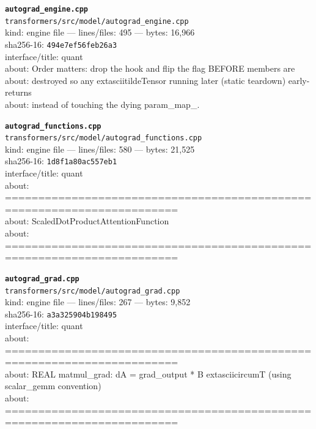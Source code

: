 \noindent\textbf{\texttt{autograd\_engine.cpp}}\\
\texttt{transformers/src/model/autograd\_engine.cpp}\\
kind: engine file --- lines/files: 495 --- bytes: 16,966\\
sha256-16: \texttt{494e7ef56feb26a3}\\
interface/title: quant\\
about: Order matters: drop the hook and flip the flag BEFORE members are\\
about: destroyed so any 	extasciitilde{}Tensor running later (static teardown) early-returns\\
about: instead of touching the dying param\_map\_.\\
\vspace*{6.0pt}

\noindent\textbf{\texttt{autograd\_functions.cpp}}\\
\texttt{transformers/src/model/autograd\_functions.cpp}\\
kind: engine file --- lines/files: 580 --- bytes: 21,525\\
sha256-16: \texttt{1d8f1a80ac557eb1}\\
interface/title: quant\\
about: ========================================================================\\
about: ScaledDotProductAttentionFunction\\
about: ========================================================================\\
\vspace*{6.0pt}

\noindent\textbf{\texttt{autograd\_grad.cpp}}\\
\texttt{transformers/src/model/autograd\_grad.cpp}\\
kind: engine file --- lines/files: 267 --- bytes: 9,852\\
sha256-16: \texttt{a3a325904b198495}\\
interface/title: quant\\
about: ========================================================================\\
about: REAL matmul\_grad: dA = grad\_output * B	extasciicircum{}T (using scalar\_gemm convention)\\
about: ========================================================================\\
\vspace*{6.0pt}

